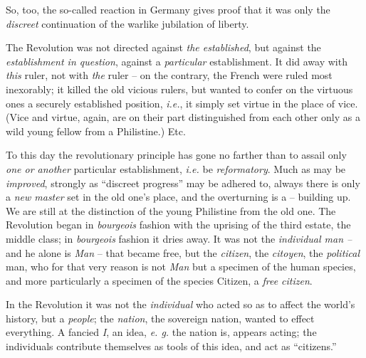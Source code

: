 So, too, the so-called reaction in Germany gives proof that it was only the 
\textit{discreet} continuation of the warlike jubilation of liberty.

The Revolution was not directed against \textit{the established}, but against 
the \textit{establishment in question}, against a \textit{particular} 
establishment. It did away with \textit{this} ruler, not with \textit{the} 
ruler -- on the contrary, the French were ruled most inexorably; it killed the 
old vicious rulers, but wanted to confer on the virtuous ones a securely 
established position, \textit{i.e.}, it simply set virtue in the place of 
vice. (Vice and virtue, again, are on their part distinguished from each other 
only as a wild young fellow from a Philistine.) Etc.

To this day the revolutionary principle has gone no farther than to assail 
only \textit{one or another} particular establishment, \textit{i.e.} be 
\textit{reformatory}. Much as may be \textit{improved}, strongly as 
``discreet progress'' may be adhered to, always there is only a \textit{new 
master} set in the old one's place, and the overturning is a -- building up. 
We are still at the distinction of the young Philistine from the old one. The 
Revolution began in \textit{bourgeois} fashion with the uprising of the third 
estate, the middle class; in \textit{bourgeois} fashion it dries away. It was 
not the \textit{individual man --} and he alone is \textit{Man} -- that became 
free, but the \textit{citizen}, the \textit{citoyen}, the \textit{political} 
man, who for that very reason is not \textit{Man} but a specimen of the human 
species, and more particularly a specimen of the species Citizen, a 
\textit{free citizen}.

In the Revolution it was not the \textit{individual} who acted so as to affect 
the world's history, but a \textit{people}; the \textit{nation}, the sovereign 
nation, wanted to effect everything. A fancied \textit{I}, an idea, \textit{e. 
g.} the nation is, appears acting; the individuals contribute themselves as 
tools of this idea, and act as ``citizens.''


